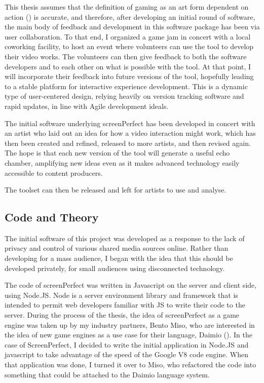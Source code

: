 This thesis assumes that the definition of gaming as an art form dependent on action (\cite{galloway}) is accurate, and therefore, after developing an initial round of software, the main body of feedback and development in this software package has been via user collaboration. To that end, I organized a game jam in concert with a local coworking facility, to host an event where volunteers can use the tool to develop their video works. The volunteers can then give feedback to both the software developers and to each other on what is possible with the tool. At that point, I will incorporate their feedback into future versions of the tool, hopefully leading to a stable platform for interactive experience development. This is a dynamic type of user-centered design, relying heavily on version tracking software and rapid updates, in line with Agile development ideals.

The initial software underlying screenPerfect has been developed in concert with an artist who laid out an idea for how a video interaction might work, which has then been created and refined, released to more artists, and then revised again. The hope is that each new version of the tool will generate a useful echo chamber, amplifying new ideas even as it makes advanced technology easily accessible to content producers.

The toolset can then be released and left for artists to use and analyse.

\subsection{Code and Theory}

The initial software of this project was developed as a response to the lack of privacy and control of various shared media sources online. Rather than developing for a mass audience, I began with the idea that this should be developed privately, for small audiences using disconnected technology.

The code of screenPerfect was written in Javascript on the server and client side, using Node.JS. Node is a server environment library and framework that is intended to permit web developers familiar with JS to write their code to the server. During the process of the thesis, the idea of screenPerfect as a game engine was taken up by my industry partners, Bento Miso, who are interested in the idea of new game engines as a use case for their language, Daimio (\cite{daimio}). In the case of ScreenPerfect, I decided to write the initial application in Node.JS and javascript to take advantage of the speed of the Google V8 code engine. When that application was done, I turned it over to Miso, who refactored the code into something that could be attached to the Daimio language system.

